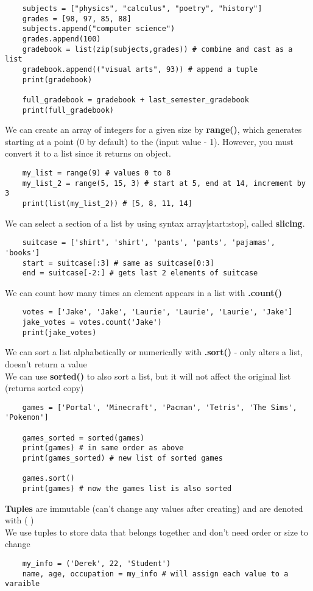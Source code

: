 \documentclass[11pt, a4paper]{article}
\begin{document}
\begin{spacing}{1.1}
\begin{lstlisting}
	subjects = ["physics", "calculus", "poetry", "history"]
	grades = [98, 97, 85, 88]
	subjects.append("computer science")
	grades.append(100)
	gradebook = list(zip(subjects,grades)) # combine and cast as a list
	gradebook.append(("visual arts", 93)) # append a tuple
	print(gradebook)
	
	full_gradebook = gradebook + last_semester_gradebook
	print(full_gradebook) \end{lstlisting}\vspace*{1mm}
	We can create an array of integers for a given size by \textbf{range()}, which generates starting at a point (0 by default) to the (input value - 1). However, you must convert it to a list since it returns on object.
	\begin{lstlisting}
	my_list = range(9) # values 0 to 8
	my_list_2 = range(5, 15, 3) # start at 5, end at 14, increment by 3
	print(list(my_list_2)) # [5, 8, 11, 14] \end{lstlisting}\vspace*{1mm}
	We can select a section of a list by using syntax array[start:stop], called \textbf{slicing}. 
	\begin{lstlisting}
	suitcase = ['shirt', 'shirt', 'pants', 'pants', 'pajamas', 'books']
	start = suitcase[:3] # same as suitcase[0:3]
	end = suitcase[-2:] # gets last 2 elements of suitcase \end{lstlisting}\vspace*{1mm}
	We can count how many times an element appears in a list with \textbf{.count()}
	\begin{lstlisting}
	votes = ['Jake', 'Jake', 'Laurie', 'Laurie', 'Laurie', 'Jake']
	jake_votes = votes.count('Jake')
	print(jake_votes) \end{lstlisting}\vspace*{1mm}
	We can sort a list alphabetically or numerically with \textbf{.sort()} - only alters a list, doesn't return a value \\
	We can use \textbf{sorted()} to also sort a list, but it will not affect the original list (returns sorted copy)
	\begin{lstlisting}
	games = ['Portal', 'Minecraft', 'Pacman', 'Tetris', 'The Sims', 'Pokemon']
	
	games_sorted = sorted(games)
	print(games) # in same order as above
	print(games_sorted) # new list of sorted games
	
	games.sort()
	print(games) # now the games list is also sorted \end{lstlisting}\vspace*{1mm}
	\textbf{Tuples} are immutable (can't change any values after creating) and are denoted with ( ) \\
	We use tuples to store data that belongs together and don't need order or size to change
	\begin{lstlisting}
	my_info = ('Derek', 22, 'Student')
	name, age, occupation = my_info # will assign each value to a varaible
	

\end{lstlisting}
\end{spacing}
\end{document}

